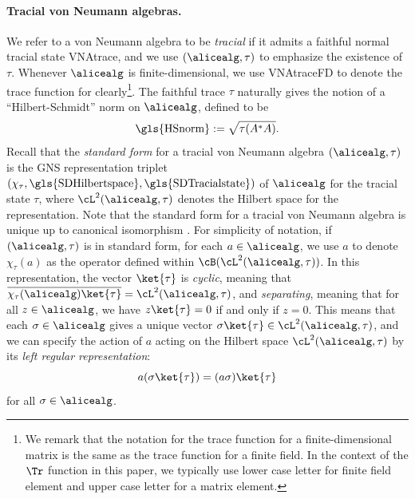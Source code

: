 \paragraph{Tracial von Neumann algebras.}  We refer to a von Neumann algebra to be \textit{tracial} if it admits a faithful normal tracial state \gls{VNAtrace}, and we use $(\alicealg, \tau)$ to emphasize the existence of $\tau$. Whenever $\alicealg$ is finite-dimensional, we use \gls{VNAtraceFD} to denote the trace function for clearly\footnote{We remark that the notation for the trace function for a finite-dimensional matrix is the same as the trace function for a finite field. In the context of the $\Tr$ function in this paper, we typically use lower case letter for finite field element and upper case letter for a matrix element.}. The faithful trace $\tau$ naturally gives the notion of a ``Hilbert-Schmidt'' norm on $\alicealg$, defined to be
\begin{equation*}
	\text{\gls{HSnorm}} := \sqrt{\tau(A^* A)}.
\end{equation*}
Recall that the \textit{standard form} for a tracial von Neumann algebra $(\alicealg, \tau)$ is the GNS representation triplet $(\chi_{\tau}, \text{\gls{SDHilbertspace}}, \text{\gls{SDTracialstate}})$ of $\alicealg$ for the tracial state $\tau$, where $\cL^2(\alicealg, \tau)$ denotes the Hilbert space for the representation. Note that the standard form for a tracial von Neumann algebra is unique up to canonical isomorphism \cite[Proposition 7.5.1]{anantharamanIntroductionII1Factors2010}. For simplicity of notation, if $(\alicealg, \tau)$ is in standard form, for each $a \in \alicealg$, we use $a$ to denote $\chi_{\tau}(a)$ as the operator defined within $\cB(\cL^2(\alicealg, \tau))$. In this representation, the vector $\ket{\tau}$ is \textit{cyclic}, meaning that $\overline{\chi_{\tau}(\alicealg) \ket{\tau}} = \cL^2(\alicealg, \tau)$, and \textit{separating}, meaning that for all $z \in \alicealg$, we have $z \ket{\tau} = 0$ if and only if $z = 0$. This means that each $\sigma \in \alicealg$ gives a unique vector $\sigma \ket{\tau} \in \cL^2(\alicealg, \tau)$, and we can specify the action of $a$ acting on the Hilbert space $\cL^2(\alicealg, \tau)$ by its \textit{left regular representation}:
\begin{equation*}
	a (\sigma \ket{\tau}) = (a \sigma) \ket{\tau}
\end{equation*}
for all $\sigma \in \alicealg$.

